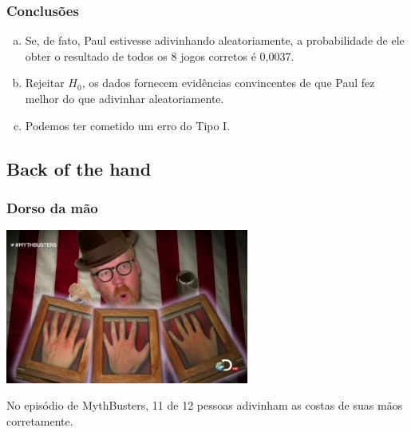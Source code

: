 \documentclass[11pt]{beamer}
\begin{document}

\begin{frame}
\frametitle{Conclusões}


\begin{enumerate}[(a)]

\item Se, de fato, Paul estivesse adivinhando aleatoriamente, a probabilidade de ele obter o resultado de todos os 8 jogos corretos é 0,0037.

\item Rejeitar $ H_0 $, os dados fornecem evidências convincentes de que Paul fez melhor do que adivinhar aleatoriamente.

\item Podemos ter cometido um erro do Tipo I.


\end{enumerate}

\end{frame}


\subsection{Back of the hand}


\begin{frame}
\frametitle{Dorso da mão}


\pause

\begin{center}
\includegraphics[width=0.6\textwidth]{mythbusters.png}
\end{center}

No episódio de MythBusters, 11 de 12 pessoas adivinham as costas de suas mãos corretamente.

\end{frame}
\end{document}
